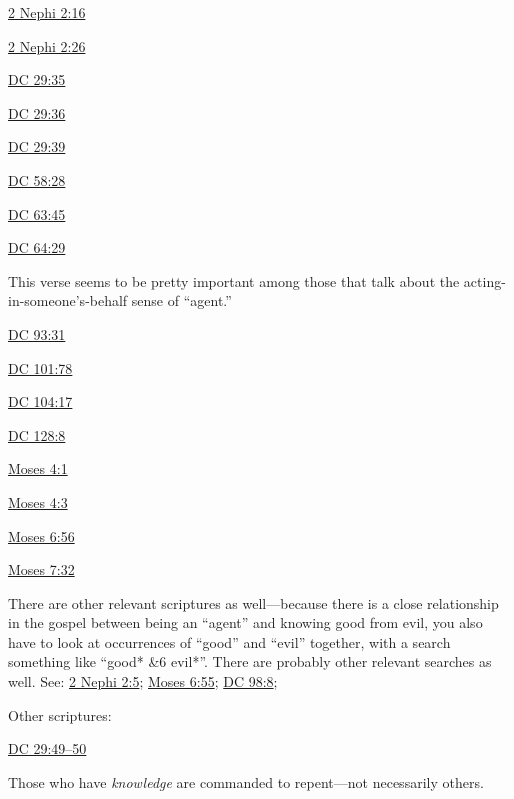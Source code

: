 			\begin{compactitem}
				\item \hyperref[2NEPHI-2-16]{2 Nephi 2:16}
				\item \hyperref[2NEPHI-2-26]{2 Nephi 2:26}
				\item \hyperref[DC29-35]{DC 29:35}
				\item \hyperref[DC29-36]{DC 29:36}
				\item \hyperref[DC29-39]{DC 29:39}
				\item \hyperref[DC58-28]{DC 58:28}
				\item \hyperref[DC63-45]{DC 63:45}
				\item \hyperref[DC64-29]{DC 64:29}
					\begin{compactitem}
						\item This verse seems to be pretty important among those that talk about the acting-in-someone's-behalf sense of ``agent.''
					\end{compactitem}
				\item \hyperref[DC93-31]{DC 93:31}
				\item \hyperref[DC101-78]{DC 101:78}
				\item \hyperref[DC104-17]{DC 104:17}
				\item \hyperref[DC128-8]{DC 128:8}
				\item \hyperref[MOSES-4-1]{Moses 4:1}
				\item \hyperref[MOSES-4-3]{Moses 4:3}
				\item \hyperref[MOSES-6-56]{Moses 6:56}
				\item \hyperref[MOSES-7-32]{Moses 7:32}
			\end{compactitem}
		
		There are other relevant scriptures as well---because there is a close relationship in the gospel between being an ``agent'' and knowing good from evil, you also have to look at occurrences of ``good'' and ``evil'' together, with a search something like ``good* \&6 evil*''. There are probably other relevant searches as well. See: \hyperref[2NEPHI-2-5]{2 Nephi 2:5}; \hyperref[MOSES-6-55]{Moses 6:55}; \hyperref[DC98-8]{DC 98:8}; 
		
		Other scriptures:
		
			\begin{compactitem}
				\item \hyperref[DC29-49]{DC 29:49--50}
					\begin{compactitem}
						\item Those who have \textit{knowledge} are commanded to repent---not necessarily others.
					\end{compactitem}
			\end{compactitem}
		
